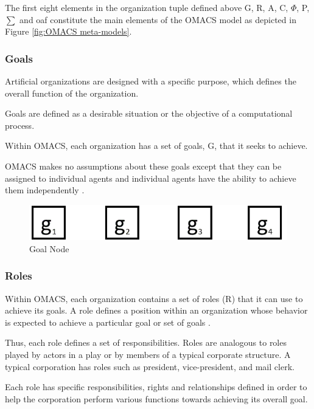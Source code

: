 The first eight elements in the organization tuple defined above G, R, A, C, $\varPhi$, P, $\sum$ and oaf constitute the main elements of the OMACS model as depicted in Figure \ref{fig:OMACS meta-models}.

\subsubsection{Goals}

Artificial organizations are designed with a specific purpose, which defines the overall function
of the organization\cite{omacs2}.

Goals are defined as a desirable situation or the objective of a
computational process.

Within OMACS, each organization has a set of goals, G, that it seeks
to achieve.

OMACS makes no assumptions about these goals except that they can be assigned to
individual agents and individual agents have the ability to achieve them independently \cite{omacs2}.
\hspace{1cm}
\begin{figure}[th]
	\centering
		\includegraphics[scale=0.5]{ch1/img/goals}
	\caption{\label{fig:Goal Node}Goal Node }
\end{figure}
\hspace{1cm}
\subsubsection{Roles} 

Within OMACS, each organization contains a set of roles (R) that it can use to achieve its goals.
A role defines a position within an organization whose behavior is expected to achieve a
particular goal or set of goals \cite{omacs2}.

Thus, each role defines a set of responsibilities. Roles are
analogous to roles played by actors in a play or by members of a typical corporate structure. A
typical corporation has roles such as president, vice-president, and mail clerk. 

Each role has specific responsibilities, rights and relationships defined in order to help the corporation
perform various functions towards achieving its overall goal. 

